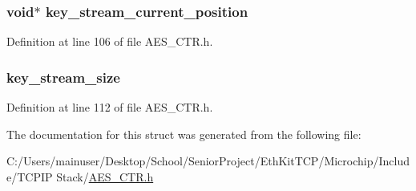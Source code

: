\subsubsection[{key\+\_\+stream\+\_\+current\+\_\+position}]{\setlength{\rightskip}{0pt plus 5cm}void$\ast$ key\+\_\+stream\+\_\+current\+\_\+position}\label{struct_a_e_s___c_t_r___s_t_a_t_e___d_a_t_a_a3c812318caf3958da111ac64c4cd17c0}


Definition at line 106 of file A\+E\+S\+\_\+\+C\+T\+R.\+h.

\hypertarget{struct_a_e_s___c_t_r___s_t_a_t_e___d_a_t_a_a7eb68e0d44cc46f9d21543bfa2edf0e4}{}
\subsubsection[{key\+\_\+stream\+\_\+size}]{ key\+\_\+stream\+\_\+size}\label{struct_a_e_s___c_t_r___s_t_a_t_e___d_a_t_a_a7eb68e0d44cc46f9d21543bfa2edf0e4}


Definition at line 112 of file A\+E\+S\+\_\+\+C\+T\+R.\+h.



The documentation for this struct was generated from the following file\+:\begin{DoxyCompactItemize}
\item 
C\+:/\+Users/mainuser/\+Desktop/\+School/\+Senior\+Project/\+Eth\+Kit\+T\+C\+P/\+Microchip/\+Include/\+T\+C\+P\+I\+P Stack/\hyperlink{_a_e_s___c_t_r_8h}{A\+E\+S\+\_\+\+C\+T\+R.\+h}\end{DoxyCompactItemize}
